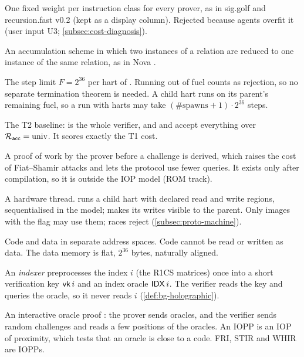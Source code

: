 \begin{description}[leftmargin=0pt,itemsep=2pt,parsep=0pt,font=\normalfont\bfseries]
\item[Flat per-instruction model.] One fixed weight per instruction class for every prover, as in
  sig.golf and recursion.fast v0.2 (kept as a display column). Rejected because agents overfit it
  (user input U3; \cref{subsec:cost-diagnosis}).

\item[Folding scheme.] An accumulation scheme in which two instances of a relation are reduced to
  one instance of the same relation, as in Nova \cite{KST22-Nova}.

\item[Fuel.] The step limit $F=2^{36}$ per hart of . Running out of fuel counts as
  rejection, so no separate termination theorem is needed. A child hart runs on its parent's
  remaining fuel, so a run with harts may take $(\#\mathrm{spawns}+1)\cdot2^{36}$ steps.

\item[fullRecAcc.] The T2 baseline:  is the whole verifier, and  and
   accept everything over $\mathcal{R}_{\mathsf{acc}}=\mathrm{univ}$. It scores exactly the T1 cost.

\item[Grinding.] A proof of work by the prover before a challenge is derived, which raises the cost
  of Fiat--Shamir attacks and lets the protocol use fewer queries. It exists only after
  compilation, so it is outside the IOP model (ROM track).

\item[Hart; SPAWN, JOIN.] A hardware thread.  runs a child hart with declared read and
  write regions, sequentialised in the model;  makes its writes visible to the parent. Only
  images with the  flag may use them; races reject (\cref{subsec:proto-machine}).

\item[Harvard memory.] Code and data in separate address spaces. Code cannot be read or written as
  data. The data memory is flat, $2^{36}$ bytes, naturally aligned.

\item[Holography; indexer.] An \emph{indexer} preprocesses the index $i$ (the R1CS matrices) once
  into a short verification key $\mathsf{vk}\,i$ and an index oracle $\mathsf{IDX}\,i$. The verifier reads the key
  and queries the oracle, so it never reads $i$ \cite{CHMMVW20-Marlin,COS20}
  (\cref{def:bg-holographic}).

\item[IOP; IOPP.] An interactive oracle proof \cite{BCS16,RRR16}: the prover sends oracles, and the
  verifier sends random challenges and reads a few positions of the oracles. An IOPP is an IOP of
  proximity, which tests that an oracle is close to a code. FRI, STIR and WHIR are IOPPs.


\end{description}
